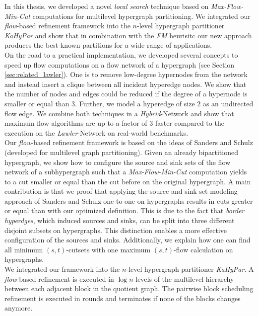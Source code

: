 In this thesis, we developed a novel \emph{local search} technique based on \emph{Max-Flow-Min-Cut}
computations for multilevel hypergraph partitioning. We integrated our \emph{flow}-based
refinement framework into the $n$-level hypergraph partitioner \emph{KaHyPar} and show that
in combination with the \emph{FM} heurisitc our new approach produces the best-known partitions
for a wide range of applications.\\
On the road to a practical implementation, we developed several concepts to speed up flow
computations on a flow network of a hypergraph (see Section \ref{sec:related_lawler}).
One is to remove low-degree hypernodes from the network and instead insert a clique 
between all incident hyperedge nodes. We show that the number of nodes and edges could
be reduced if the degree of a hypernode is smaller or equal than $3$. Further, we model a hyperedge
of size $2$ as an undirected flow edge. We combine both techniques in a \emph{Hybrid}-Network 
and show that maximum flow algorithms are up to a factor of $3$ faster compared to
the execution on the \emph{Lawler}-Network \cite{lawler1973} on real-world benchmarks. \\
Our \emph{flow}-based refinement framework is based on the ideas of Sanders and Schulz
\cite{sanders2011engineering} (developed for multilevel graph partitioning). Given an already bipartitioned
hypergraph, we show how to configure the source and sink sets of the flow network 
of a subhypergraph such that a \emph{Max-Flow-Min-Cut} computation yields to a cut smaller 
or equal than the cut before on the original hypergraph. A main contribution is that we proof
that applying the source and sink set modeling approach of Sanders and Schulz one-to-one on 
hypergraphs results in cuts greater or equal than with our optimized definition. This is due to
the fact that \emph{border hyperdges}, which induced sources and sinks, can be
split into three different disjoint subsets on hypergraphs. This distinction enables a more effective
configuration of the sources and sinks. Additionally, we explain how one can find all 
minimum $(s,t)$-cutsets with one maximum $(s,t)$-flow calculation on hypergraphs. \\
We integrated our framework into the $n$-level hypergraph partitioner
\emph{KaHyPar}. A \emph{flow}-based refinement is executed in $\log{n}$ levels of the multilevel
hierarchy between each adjacent block in the quotient graph. The pairwise block scheduling 
refinement is executed in rounds and terminates if none of the blocks changes anymore.
